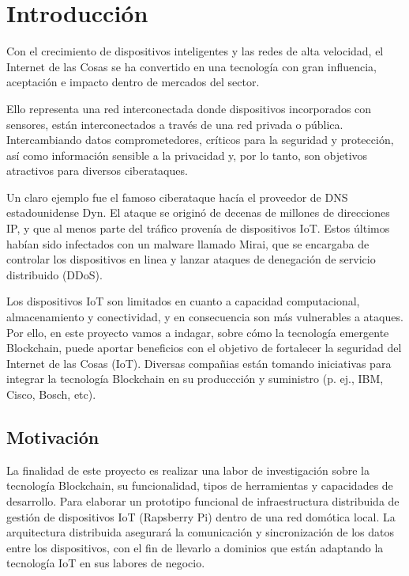 \section{Introducción}

Con el crecimiento de dispositivos inteligentes y las redes de alta velocidad, el Internet de las Cosas se ha convertido
en una tecnología con gran influencia, aceptación e impacto dentro de mercados del sector. 

\vspace{5mm}

\noindent Ello representa una red interconectada donde dispositivos incorporados con sensores, están interconectados a 
través de una red privada o pública. Intercambiando datos comprometedores, críticos para la seguridad y protección, así 
como información sensible a la privacidad y, por lo tanto, son objetivos atractivos para diversos ciberataques.

\vspace{5mm}

\noindent Un claro ejemplo fue el famoso ciberataque hacía el proveedor de DNS estadounidense Dyn. El ataque se originó 
de decenas de millones de direcciones IP, y que al menos parte del tráfico provenía de dispositivos IoT. Estos últimos 
habían sido infectados con un malware llamado Mirai, que se encargaba de controlar los dispositivos en linea y lanzar 
ataques de denegación de servicio distribuido (DDoS).

\vspace{5mm}

\noindent Los dispositivos IoT son limitados en cuanto a capacidad computacional, almacenamiento y conectividad, y en 
consecuencia son más vulnerables a ataques. Por ello, en este proyecto vamos a indagar, sobre cómo la tecnología 
emergente Blockchain, puede aportar beneficios con el objetivo de fortalecer la seguridad del Internet de las Cosas 
(IoT). Diversas compañias están tomando iniciativas para integrar la tecnología Blockchain en su produccción y 
suministro (p. ej., IBM, Cisco, Bosch, etc).   


\subsection{Motivación}

La finalidad de este proyecto es realizar una labor de investigación sobre la tecnología Blockchain, su funcionalidad, 
tipos de herramientas y capacidades de desarrollo. Para elaborar un prototipo funcional de infraestructura distribuida 
de gestión de dispositivos IoT (Rapsberry Pi) dentro de una red domótica local. La arquitectura distribuida asegurará 
la comunicación y sincronización de los datos entre los dispositivos, con el fin de llevarlo a dominios que están 
adaptando la tecnología IoT en sus labores de negocio.

